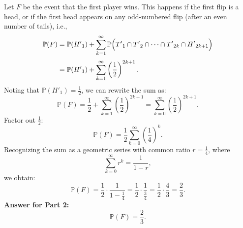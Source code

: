 \documentclass[12pt]{article}
\begin{document}
Let $F$ be the event that the first player wins. This happens if the first flip is a head, or if the first head appears on any odd-numbered flip (after an even number of tails), i.e.,
\[
\begin{aligned}
\mathbb{P}(F) &= \mathbb{P}({H'}_1) + \sum_{k=1}^{\infty} \mathbb{P}\Bigl({T'}_1\cap {T'}_2\cap \cdots \cap {T'}_{2k}\cap {H'}_{2k+1}\Bigr)\\[1mm]
&= \mathbb{P}({H'}_1) + \sum_{k=1}^{\infty} \left(\frac{1}{2}\right)^{2k+1}.
\end{aligned}
\]
Noting that $\mathbb{P}({H'}_1)=\frac{1}{2}$, we can rewrite the sum as:
\[
\mathbb{P}(F) = \frac{1}{2} + \sum_{k=1}^{\infty}\left(\frac{1}{2}\right)^{2k+1}
= \sum_{k=0}^{\infty}\left(\frac{1}{2}\right)^{2k+1}.
\]
Factor out $\frac{1}{2}$:
\[
\mathbb{P}(F) = \frac{1}{2}\sum_{k=0}^{\infty}\left(\frac{1}{4}\right)^k.
\]
Recognizing the sum as a geometric series with common ratio $r=\frac{1}{4}$, where
\[
\sum_{k=0}^{\infty} r^k = \frac{1}{1-r},
\]
we obtain:
\[
\mathbb{P}(F) = \frac{1}{2} \cdot \frac{1}{1-\frac{1}{4}} = \frac{1}{2} \cdot \frac{1}{\frac{3}{4}} = \frac{1}{2}\cdot \frac{4}{3} = \frac{2}{3}.
\]
\textbf{Answer for Part 2:}
\[
\boxed{\mathbb{P}(F) = \frac{2}{3}}.
\]
\end{document}
